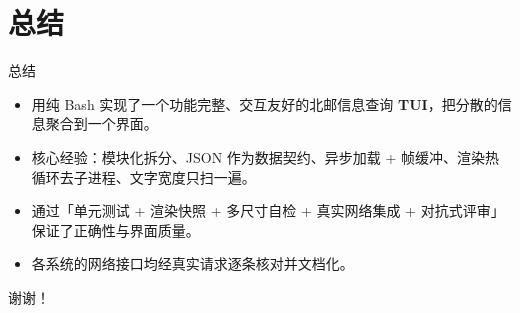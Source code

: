 \documentclass[aspectratio=169]{beamer}
\begin{document}
\section{总结}

\begin{frame}{总结}
  \begin{itemize}
    \setlength\itemsep{0.8em}
    \item 用纯 Bash 实现了一个功能完整、交互友好的北邮信息查询 \textbf{TUI}，把分散的信息聚合到一个界面。
    \item 核心经验：模块化拆分、JSON 作为数据契约、异步加载 + 帧缓冲、渲染热循环去子进程、文字宽度只扫一遍。
    \item 通过「单元测试 + 渲染快照 + 多尺寸自检 + 真实网络集成 + 对抗式评审」保证了正确性与界面质量。
    \item 各系统的网络接口均经真实请求逐条核对并文档化。
  \end{itemize}
  \vspace{1em}
  \centering 谢谢！
\end{frame}
\end{document}
